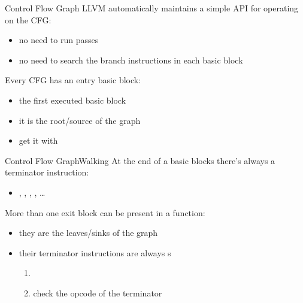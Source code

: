 \begin{frame}{Control Flow Graph}
LLVM automatically maintains a simple API for operating on the CFG:

\begin{itemize}
\item no need to run passes
\item no need to search the branch instructions in each basic block
\end{itemize}
\bigskip
Every CFG has an \alert{entry} basic block:

\begin{itemize}
\item the \alert{first} executed basic block
\item it is the \alert{root/source} of the graph
\item get it with 
\end{itemize}

\end{frame}


\begin{frame}{Control Flow Graph}{Walking}
At the end of a basic blocks there's always a \alert{terminator} instruction:
\begin{itemize}
\item {}, , , , \ldots
\end{itemize}

\bigskip
More than one \alert{exit} block can be present in a function:

\begin{itemize}
\item they are the \alert{leaves/sinks} of the graph
\item their terminator instructions are always s
\begin{enumerate}
\item {}
\item check the opcode of the terminator
\end{enumerate}
\end{itemize}
\end{frame}


